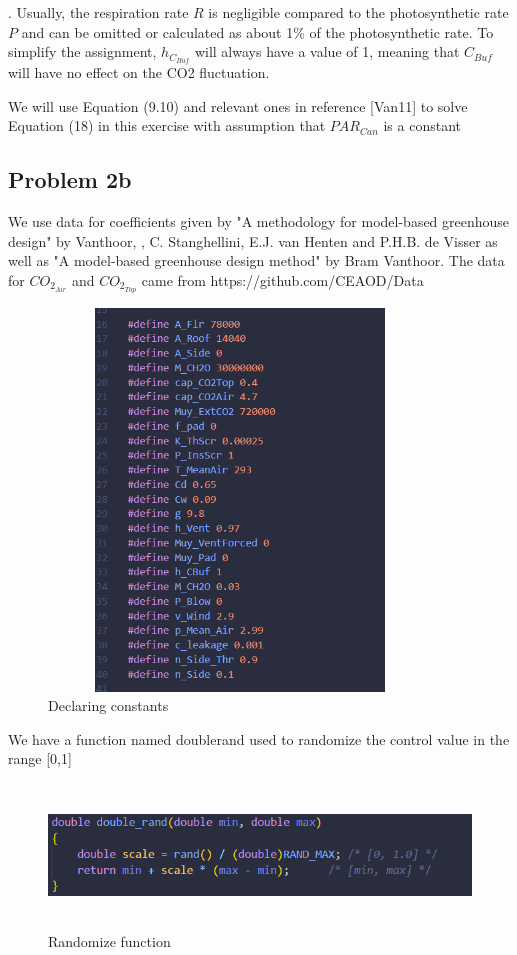 . Usually, the
respiration rate $R$ is negligible compared to the photosynthetic rate $P$ and can be omitted or calculated
as about 1\% of the photosynthetic rate. To simplify the assignment, $h_{C_{Buf}}$ will always have a value of 1, meaning that $C_{Buf}$ will have
no effect on the CO2 fluctuation.

We will use Equation (9.10) and relevant
ones in reference [Van11] to solve Equation (18) in this exercise with assumption that $PAR_{Can}$ is a constant

\subsection{Problem 2b}
We use data for coefficients given by "A methodology for model-based greenhouse design" by Vanthoor, , C. Stanghellini,  E.J. van Henten and P.H.B. de Visser as well as "A model-based greenhouse design method" by Bram Vanthoor.
The data for $CO_{2_{Air}}$ and  $CO_{2_{Top}}$ came from https://github.com/CEAOD/Data
\begin{figure}[h]
\centering
    \includegraphics[width = 4in, height = 4in]{Code/Pic/constant.png}
    \caption{Declaring constants}
    \label{fig:my_label}
\end{figure}


We have a function named doublerand used to randomize the control value in the range [0,1]

\begin{figure}[h]
\centering
    \includegraphics[width = 5.5in, height = 1.5in]{Code/Pic/random.png}
    \caption{Randomize function}
    \label{fig:my_label}
\end{figure}

